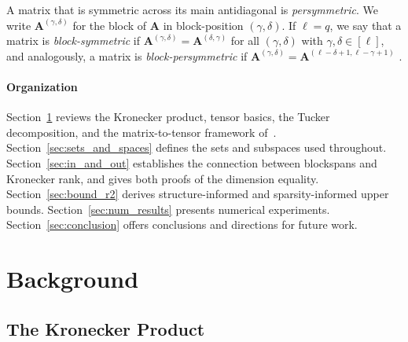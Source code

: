 \documentclass{siamart251216}
\def\bA{\mathbf{A}}
\begin{document}
A matrix that is symmetric across its main antidiagonal is \emph{persymmetric}.  We write
$\bA^{(\gamma,\delta)}$ for the block of $\bA$ in block-position $(\gamma,\delta)$. If $\ell = q$, we say that a matrix is
\emph{block-symmetric} if $\bA^{(\gamma,\delta)} = \bA^{(\delta,\gamma)}$ for all $(\gamma,\delta)$
with $\gamma,\delta\in[\ell]$, and analogously, a matrix is \emph{block-persymmetric} if $\bA^{(\gamma,\delta)} = \bA^{(\ell-\delta+1,\ell-\gamma+1)}$ .

\paragraph{Organization}
Section~\ref{sec:bckgrnd} reviews the Kronecker product, tensor basics, the Tucker decomposition,
and the matrix-to-tensor framework of~\cite{kilmer2022matrixtensordecomp}.
Section~\ref{sec:sets_and_spaces} defines the sets and subspaces used throughout.
Section~\ref{sec:in_and_out} establishes the connection between blockspans and Kronecker rank, and
gives both proofs of the dimension equality.
Section~\ref{sec:bound_r2} derives structure-informed and sparsity-informed upper bounds.
Section~\ref{sec:num_results} presents numerical experiments.
Section~\ref{sec:conclusion} offers conclusions and directions for future work.

\section{Background}
\label{sec:bckgrnd}

\subsection{The Kronecker Product}
\label{subsec:kron}
\end{document}
